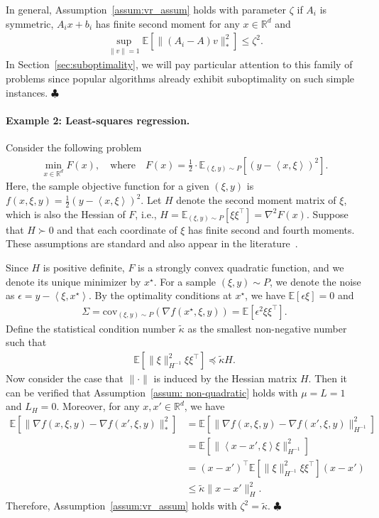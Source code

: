 \documentclass[11pt,twoside]{article}
\numberwithin{equation}{section}
\newcommand{\EE}{\mathbb{E}}
\newcommand{\RR}{\mathbb{R}}
\newcommand{\1}{\mathbf{1}}
\newcommand{\dotp}[1]{\left\langle #1\right\rangle}
\theoremstyle{remark}
\theoremstyle{plain}
\newcommand{\cov}{\mathrm{cov}}
\newcommand{\liph}{L_H}
\begin{document}
In general, Assumption~\ref{assum:vr_assum} holds with parameter $\zeta$ if $A_i$ is symmetric, $A_i x + b_i$ has finite second moment for any $x \in \RR^d$ and 
\begin{align*}
	\sup_{\|v\| = 1} \EE[\|(A_i - A) v\|_*^2] \le \zeta^2.
\end{align*}
In Section~\ref{sec:suboptimality}, we will pay particular attention to this family of problems since popular algorithms already exhibit suboptimality on such simple instances. \hfill $\clubsuit$

\paragraph{Example 2: Least-squares regression.}
Consider the following problem
\begin{align*}
	\min_{x\in \RR^d} F(x), \quad \text{where} \quad F(x) =  \frac{1}{2}  \cdot \EE_{(\xi,y) \sim P}[(y- \dotp{x,\xi})^2].
\end{align*}
Here, the sample objective function for a given $(\xi,y)$ is $f(x,\xi,y) = \frac{1}{2} (y - \dotp{x,\xi})^2$.
Let $H$ denote the second moment matrix of $\xi$, which is also the Hessian of $F$, i.e., 	$H = \EE_{(\xi,y) \sim P}[ \xi \xi^\top] = \nabla^2 F(x)$.	Suppose that $H \succ 0$ and that each coordinate of $\xi$ has finite second and fourth moments. 
These assumptions are standard and also appear in the literature~\cite[Section 2.1]{jain2018accelerating}. 

Since $H$ is positive definite, $F$ is a strongly convex quadratic function, and we denote its unique minimizer by $x^\star$. For a sample $(\xi,y)\sim P$, we denote the noise as $\epsilon = y - \dotp{\xi, x^\star}$. By the optimality conditions at $x^\star$, we have $\EE[\epsilon \xi] = 0$ and 
\begin{align*}
\Sigma = \cov_{(\xi,y)\sim P} (\nabla f(x^\star, \xi,y)) = \EE[\epsilon^2 \xi \xi^\top ].
\end{align*} Define the statistical condition number $\tilde \kappa$ as the smallest non-negative number such that
\begin{align}\label{eqn:stochastic_cond_number}
\EE[\|\xi\|_{H^{-1}}^2 \xi \xi^\top ]  \preceq  \tilde \kappa H.
\end{align}
Now consider the case that $\|\cdot\|$ is induced by the Hessian matrix $H$. Then it can be verified that Assumption~\ref{assum: non-quadratic} holds with $\mu =L = 1$ and $\liph = 0$. Moreover, for any $x,x'\in \RR^d$, we have
\begin{align*}
\EE[\|\nabla f(x,\xi,y) - \nabla f(x', \xi,y)\|_*^2] &= \EE[\|\nabla f(x,\xi,y) - \nabla f(x', \xi,y)\|_{H^{-1}}^2] \\
&= \EE[\|\dotp{x-x', \xi} \xi\|_{H^{-1}}^2]\\
&= (x-x')^\top \EE[\|\xi\|_{H^{-1}}^2 \xi \xi^\top ] (x-x')\\
&\le \tilde \kappa \|x-x'\|_H^2.
\end{align*} 
Therefore, Assumption~\ref{assum:vr_assum} holds with $\zeta^2 = \tilde \kappa$.
\hfill $\clubsuit$
\end{document}
